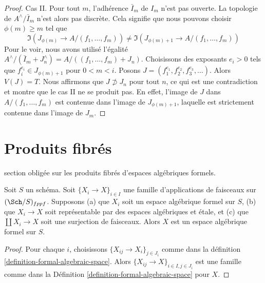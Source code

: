 \begin{proof}
\medskip\noindent
Cas II. Pour tout $m$, l'adhérence $\bar I_m$ de $I_m$ n'est pas ouverte.
La topologie de $A^\wedge/\bar I_m$ n'est alors pas discrète. Cela signifie
que nous pouvons choisir $\phi(m) \geq m$ tel que
$$
\Im(J_{\phi(m)} \to A/(f_1, \ldots, f_m)) \not =
\Im(J_{\phi(m) + 1} \to A/(f_1, \ldots, f_m))
$$
Pour le voir, nous avons utilisé l'égalité
$A^\wedge/(\bar I_m + J_n^\wedge) = A/((f_1, \ldots, f_m) + J_n)$.
Choisissons des exposants $e_i > 0$ tels que $f_i^{e_i} \in J_{\phi(m) + 1}$
pour $0 < m < i$. Posons $J = (f_1^{e_1}, f_2^{e_2}, f_3^{e_3}, \ldots)$.
Alors $V(J) = T$. Nous affirmons que $J \not \supset J_n$ pour tout $n$,
ce qui est une contradiction et montre que le cas II ne se produit pas.
En effet, l'image de $J$ dans $A/(f_1, \ldots, f_m)$ est contenue
dans l'image de $J_{\phi(m) + 1}$, laquelle est strictement contenue dans
l'image de $J_m$.
\end{proof}
















\section{Produits fibrés}
\label{section-fibre-products}

\noindent
section obligée sur les produits fibrés d'espaces algébriques formels.

\begin{lemma}
\label{lemma-etale-covering-by-formal-algebraic-spaces}
Soit $S$ un schéma. Soit $\{X_i \to X\}_{i \in I}$ une famille d'applications
de faisceaux sur $(\Sch/S)_{fppf}$. Supposons (a) que $X_i$ soit un
espace algébrique formel sur $S$, (b) que $X_i \to X$ soit représentable
par des espaces algébriques et étale, et (c) que $\coprod X_i \to X$
soit une surjection de faisceaux. Alors $X$ est un espace algébrique formel
sur $S$.
\end{lemma}

\begin{proof}
Pour chaque $i$, choisissons $\{X_{ij} \to X_i\}_{j \in J_i}$ comme dans la
définition \ref{definition-formal-algebraic-space}.
Alors $\{X_{ij} \to X\}_{i \in I, j \in J_i}$ est une famille
comme dans la Définition \ref{definition-formal-algebraic-space}
pour $X$.
\end{proof}

